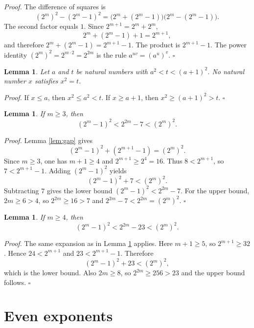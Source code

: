 \documentclass[11pt,letterpaper]{article}
\newtheorem{lemma}[theorem]{Lemma}
\newenvironment{proof}{\noindent\textit{Proof.}}{\hfill\(\square\)}
\begin{document}
\begin{proof}
The difference of squares is
\[
(2^m)^2-(2^m-1)^2=\bigl(2^m+(2^m-1)\bigr)\bigl(2^m-(2^m-1)\bigr).
\]
The second factor equals \(1\). Since \(2^{m+1}=2^m+2^m\),
\[
2^m+(2^m-1)+1=2^{m+1},
\]
and therefore \(2^m+(2^m-1)=2^{m+1}-1\). The product is \(2^{m+1}-1\). The power identity \((2^m)^2=2^{m\cdot 2}=2^{2m}\) is the rule \(a^{uv}=(a^u)^v\).
\end{proof}

\begin{lemma}
\label{lem:between}
Let \(a\) and \(t\) be natural numbers with \(a^2<t<(a+1)^2\). No natural number \(x\) satisfies \(x^2=t\).
\end{lemma}

\begin{proof}
If \(x\le a\), then \(x^2\le a^2<t\). If \(x\ge a+1\), then \(x^2\ge(a+1)^2>t\).
\end{proof}

\begin{lemma}
\label{lem:strict-seven}
If \(m\ge 3\), then
\[
(2^m-1)^2<2^{2m}-7<(2^m)^2.
\]
\end{lemma}

\begin{proof}
Lemma \ref{lem:gap} gives
\[
(2^m-1)^2+(2^{m+1}-1)=(2^m)^2.
\]
Since \(m\ge 3\), one has \(m+1\ge 4\) and \(2^{m+1}\ge 2^4=16\). Thus \(8<2^{m+1}\), so \(7<2^{m+1}-1\). Adding \((2^m-1)^2\) yields
\[
(2^m-1)^2+7<(2^m)^2.
\]
Subtracting \(7\) gives the lower bound \((2^m-1)^2<2^{2m}-7\). For the upper bound, \(2m\ge 6>4\), so \(2^{2m}\ge 16>7\) and \(2^{2m}-7<2^{2m}=(2^m)^2\).
\end{proof}

\begin{lemma}
\label{lem:strict-twenty}
If \(m\ge 4\), then
\[
(2^m-1)^2<2^{2m}-23<(2^m)^2.
\]
\end{lemma}

\begin{proof}
The same expansion as in Lemma \ref{lem:strict-seven} applies. Here \(m+1\ge 5\), so \(2^{m+1}\ge 32\). Hence \(24<2^{m+1}\) and \(23<2^{m+1}-1\). Therefore
\[
(2^m-1)^2+23<(2^m)^2,
\]
which is the lower bound. Also \(2m\ge 8\), so \(2^{2m}\ge 256>23\) and the upper bound follows.
\end{proof}

\section{Even exponents}
\end{document}
